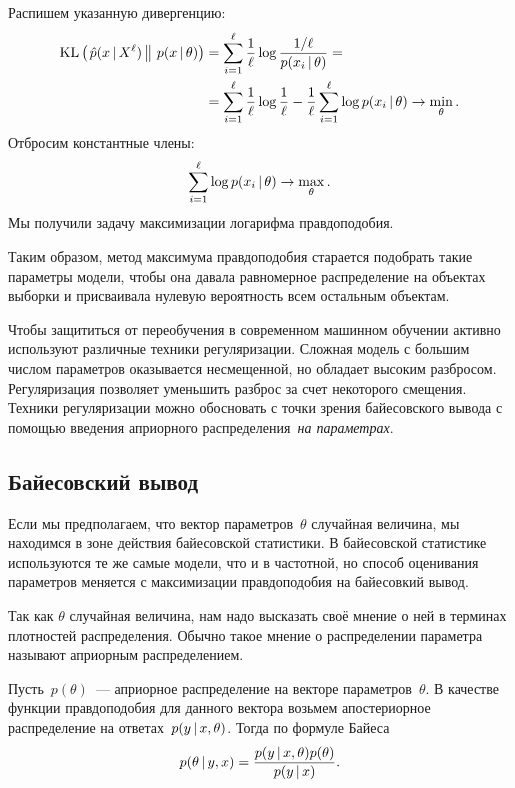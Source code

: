 \documentclass[12pt,fleqn]{article}
\begin{document}
\begin{esSolution}
    Распишем указанную дивергенцию:
    \begin{align*}
        \text{KL} \left(\left. {
            \hat p(x \mspace{3mu}{|}\mspace{3mu} X^\ell)
        } \mspace{3mu} \right\| \mspace{3mu} {
            p(x \mspace{3mu}{|}\mspace{3mu}\theta)
        } \right)
        &=
        \sum_{i = 1}^{\ell}
            \frac{1}{\ell}
            \log \frac{
                1/\ell
            }{
                p(x_i \mspace{3mu}{|}\mspace{3mu} \theta)
            }
        =\\
        &=
        \sum_{i = 1}^{\ell}
            \frac{1}{\ell}
            \log \frac{1}{\ell}
        -
        \frac{1}{\ell}
        \sum_{i = 1}^{\ell}
            \log p(x_i \mspace{3mu}{|}\mspace{3mu} \theta)
        \to \min_\theta.
    \end{align*}
    Отбросим константные члены:
    \[
        \sum_{i = 1}^{\ell}
            \log p(x_i \mspace{3mu}{|}\mspace{3mu} \theta)
        \to \max_\theta.
    \]
    Мы получили задачу максимизации логарифма правдоподобия.
    
    Таким образом, метод максимума правдоподобия старается подобрать такие параметры модели, чтобы она давала равномерное распределение на объектах выборки и присваивала нулевую вероятность всем остальным объектам.
\end{esSolution}

Чтобы защититься от переобучения в современном машинном обучении активно используют различные техники регуляризации. Сложная модель с большим числом параметров оказывается несмещенной, но обладает высоким разбросом. Регуляризация позволяет уменьшить разброс за счет некоторого смещения. Техники регуляризации можно обосновать с точки зрения байесовского вывода с помощью введения априорного распределения~\emph{на параметрах}.


\subsection{Байесовский вывод}

Если мы предполагаем, что вектор параметров~$\theta$ случайная величина, мы находимся в зоне действия байесовской статистики. В байесовской статистике используются те же самые модели, что и в частотной, но способ оценивания параметров меняется с максимизации правдоподобия на байесовкий вывод.

Так как $\theta$ случайная величина, нам надо высказать своё мнение о ней в терминах плотностей распределения. Обычно такое мнение о распределении параметра называют априорным распределением. 

Пусть~$p(\theta)$~--- априорное распределение на векторе параметров~$\theta$.
В качестве функции правдоподобия для данного вектора возьмем
апостериорное распределение на ответах~$p( y \mspace{3mu}{|}\mspace{3mu} x, \theta)$.
Тогда по формуле Байеса
\[
    p(\theta \mspace{3mu}{|}\mspace{3mu} y, x)
    =
    \frac{
        p(y \mspace{3mu}{|}\mspace{3mu} x, \theta) p(\theta)
    }{
        p(y \mspace{3mu}{|}\mspace{3mu} x)
    }.
\]
\end{document}
